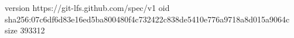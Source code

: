 version https://git-lfs.github.com/spec/v1
oid sha256:07c6df6d83e16ed5ba800480f4c732422c838de5410e776a9718a8d015a9064c
size 393312
